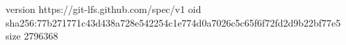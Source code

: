 version https://git-lfs.github.com/spec/v1
oid sha256:77b271771c43d438a728e542254c1e774d0a7026c5c65f6f72fd2d9b22bf77e5
size 2796368
